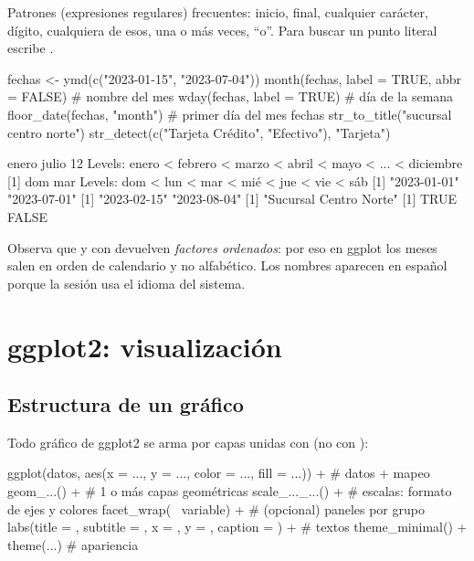 Patrones (expresiones regulares) frecuentes: \codigo{\textasciicircum{}}
inicio, \codigo{\$} final,  cualquier carácter, 
dígito, \codigo{[aeiou]} cualquiera de esos, \codigo{+} una o más veces,
\codigo{|} ``o''. Para buscar un punto literal escribe
.

\begin{rcode}
fechas <- ymd(c("2023-01-15", "2023-07-04"))
month(fechas, label = TRUE, abbr = FALSE)   # nombre del mes
wday(fechas, label = TRUE)                  # día de la semana
floor_date(fechas, "month")                 # primer día del mes
fechas %
str_to_title("sucursal centro norte")
str_detect(c("Tarjeta Crédito", "Efectivo"), "Tarjeta")
\end{rcode}
\begin{rsalida}
[1] enero julio
12 Levels: enero < febrero < marzo < abril < mayo < ... < diciembre
[1] dom mar
Levels: dom < lun < mar < mié < jue < vie < sáb
[1] "2023-01-01" "2023-07-01"
[1] "2023-02-15" "2023-08-04"
[1] "Sucursal Centro Norte"
[1]  TRUE FALSE
\end{rsalida}

Observa que  y  con 
devuelven \emph{factores ordenados}: por eso en ggplot los meses salen en
orden de calendario y no alfabético. Los nombres aparecen en español porque
la sesión usa el idioma del sistema.

\section{ggplot2: visualización}
\label{sec:ap-b-ggplot}

\subsection{Estructura de un gráfico}

Todo gráfico de ggplot2 se arma por capas unidas con \codigo{+} (no con
\codigo{\%>\%}):

\begin{textocodigo}
ggplot(datos, aes(x = ..., y = ..., color = ..., fill = ...)) +  # datos + mapeo
  geom_...() +                     # 1 o más capas geométricas
  scale_..._...() +                # escalas: formato de ejes y colores
  facet_wrap(~ variable) +         # (opcional) paneles por grupo
  labs(title = , subtitle = , x = , y = , caption = ) +  # textos
  theme_minimal() + theme(...)     # apariencia
\end{textocodigo}

